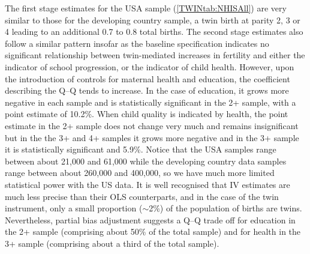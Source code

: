 \documentclass[subeqn]{article}
\begin{document}
\begin{spacing}{1.4}
The first stage estimates for the USA sample (\ref{TWINtab:NHISAll}) are very similar to those for the developing country sample, a twin birth at parity 2, 3 or 4 leading to an additional 0.7 to 0.8 total births. The second stage estimates also follow a similar pattern insofar as the baseline specification indicates no significant relationship between twin-mediated increases in fertility and either the indicator of school progression, or the indicator of child health. However, upon the introduction of controls for maternal health and education, the coefficient describing the Q--Q tends to increase. In the case of education, it grows more negative in each sample and is statistically significant in the 2+ sample, with a point estimate of 10.2\%. When child quality is indicated by health, the point estimate in the 2+ sample does not change very much and remains insignificant but in the the 3+ and 4+ samples it grows more negative and in the 3+ sample it is statistically significant and 5.9\%. Notice that the USA samples range between about 21,000 and 61,000 while the developing country data samples range between about 260,000 and 400,000, so we have much more limited statistical power with the US data. It is well recognised that IV estimates are much less precise than their OLS counterparts, and in the case of the twin instrument, only a small proportion ($\sim$2\%) of the population of births are twins. Nevertheless, partial bias adjustment suggests a Q--Q trade off for education in the 2+ sample (comprising about 50\% of the total sample) and for health in the 3+ sample (comprising about a third of the total sample). 



\end{spacing}
\end{document}
